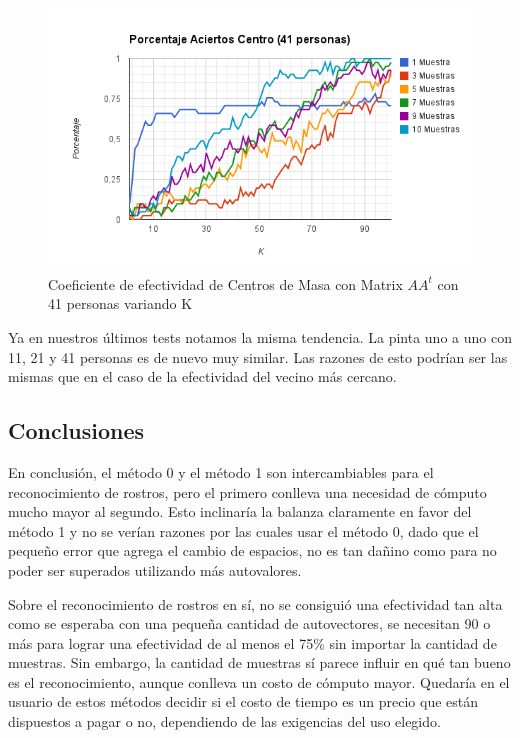 \begin{figure}[H] \includegraphics[width=1\textwidth]{img/imagef15.png} \caption{Coeficiente de
    efectividad de Centros de Masa  con Matrix $AA^t$ con 41 personas variando K} \end{figure}


Ya en nuestros últimos tests notamos la misma tendencia. La pinta uno a uno con 11, 21 y 41 personas
es de nuevo muy similar. Las razones de esto podrían ser las mismas que en el caso de la efectividad
del vecino más cercano.


\subsection{Conclusiones}

En conclusión, el método 0 y el método 1 son intercambiables para el reconocimiento de rostros, pero
el primero conlleva una necesidad de cómputo mucho mayor al segundo. Esto inclinaría la balanza
claramente en favor del método 1 y no se verían razones por las cuales usar el método 0, dado que el peque\~no error que agrega el cambio de espacios, no es tan da\~nino como para no poder ser superados utilizando m\'as autovalores.

Sobre el reconocimiento de rostros en sí, no se consiguió una efectividad tan alta como se
esperaba con una peque\~na cantidad de autovectores, se necesitan 90 o más para lograr una efectividad de al menos el 75\% sin importar
la cantidad de muestras. Sin embargo, la cantidad de muestras sí parece influir en qué tan bueno es
el reconocimiento, aunque conlleva un costo de cómputo mayor. Quedaría en el usuario de estos
métodos decidir si el costo de tiempo es un precio que están dispuestos a pagar o no, dependiendo de
las exigencias del uso elegido.

